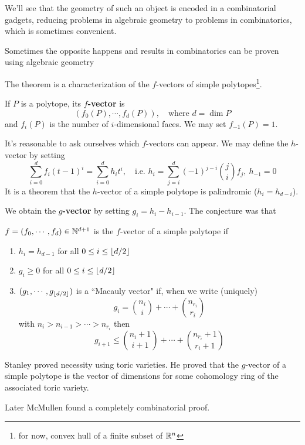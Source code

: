 We'll see that the geometry of such an object is encoded in a combinatorial gadgets, reducing problems in algebraic geometry to problems in combinatorics, which is sometimes convenient.

Sometimes the opposite happens and results in combinatorics can be proven using algebraic geometry
\begin{example}
The theorem is a characterization of the $f$-vectors of simple polytopes\footnote{for now, convex hull of a finite subset of $\mathbb{R}^n$}.

\begin{definition}[$f$-vectors]
If $P$ is a polytope, its \textbf{$f$-vector} is 
\[(f_0(P),\cdots, f_d(P)),\quad \text{where $d=\dim P$}\]
and $f_i(P)$ is the number of $i$-dimensional faces. We may set $f_{-1}(P)=1$.
\end{definition}

It's reasonable to ask ourselves which $f$-vectors can appear. We may define the $h$-vector by setting
\[\sum_{i=0}^d f_i (t-1)^i=\sum_{i=0}^dh_i t^i,\quad \text{i.e. }h_i=\sum_{j=i}^d(-1)^{j-i}\binom{j}if_j,\ h_{-1}=0\]
It is a theorem that the $h$-vector of a simple polytope is palindromic ($h_i=h_{d-i}$).

We obtain the \textbf{$g$-vector} by setting $g_i=h_i-h_{i-1}$. The conjecture was that
\begin{theorem}[$g$-conjecture]
$f=(f_0,\cdots, f_d)\in \mathbb{N}^{d+1}$ is the $f$-vector of a simple polytope if
\begin{enumerate}
\item $h_i=h_{d-1}$ for all $0\leq i\leq \left\lfloor {d/2}\right\rfloor$
\item $g_i\geq 0$ for all $0\leq i\leq \left\lfloor {d/2}\right\rfloor$
\item $(g_1,\cdots, g_{\left\lfloor {d/2}\right\rfloor})$ is a ``Macauly vector" if, when we write (uniquely)
\[g_i=\binom{n_i}i+\cdots+\binom{n_{r_i}}{r_i}\]
with $n_i>n_{i-1}>\cdots>n_{r_i}$ then
\[g_{i+1}\leq \binom{n_i+1}{i+1}+\cdots+\binom{n_{r_i}+1}{r_i+1}\]
\end{enumerate}
\end{theorem}
Stanley proved necessity using toric varieties. He proved that the $g$-vector of a simple polytope is the vector of dimensions for some cohomology ring of the associated toric variety.


Later McMullen found a completely combinatorial proof.
\end{example}